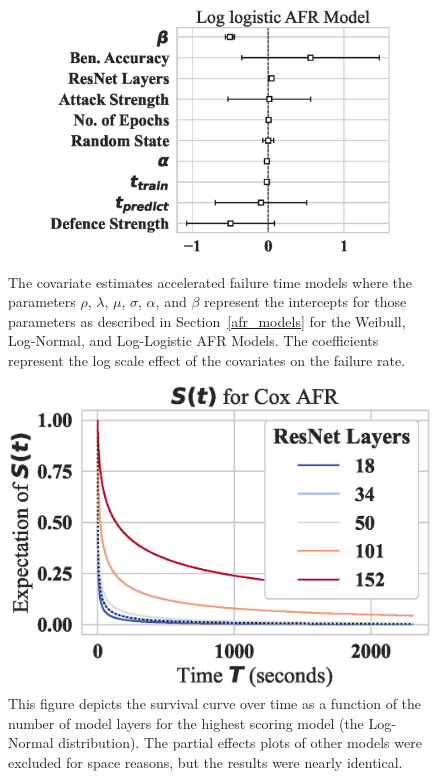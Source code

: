 \begin{figure}
\begin{subfigure}[t]{0.3\textwidth}
        \includegraphics[width=\textwidth]{cifar_log_logistic_aft.eps}
    \end{subfigure}
    
    \caption{The covariate estimates accelerated failure time models where the parameters $\rho$, $\lambda$, $\mu$, $\sigma$, $\alpha$, and $\beta$ represent the intercepts for those parameters as described in Section~\ref{afr_models} for the Weibull, Log-Normal, and Log-Logistic AFR Models. The coefficients represent the log scale effect of the covariates on the failure rate.}
    \label{fig:cifar_afr_models}
\end{figure}

\begin{figure}
    \centering\includegraphics[width=.5\textwidth]{cifar_log_normal_layers_partial_effect.eps}
    \caption{This figure depicts the survival curve over time as a function of the number of model layers for the highest scoring model (the Log-Normal distribution). The partial effects plots of other models were excluded for space reasons, but the results were nearly identical.}
    \label{fig:cifar_layers}
\end{figure}


